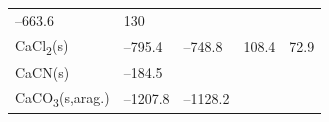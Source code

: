 \documentclass[
  9pt,
]{extbook}
\theoremstyle{definition}
\theoremstyle{definition}
\theoremstyle{definition}
\theoremstyle{remark}
\begin{document}
\begin{longtable}[]{@{}lllll@{}}
\begin{minipage}[t]{0.20\columnwidth}
--663.6\strut
\end{minipage} & \begin{minipage}[t]{0.18\columnwidth}\raggedright
130\strut
\end{minipage} & \begin{minipage}[t]{0.18\columnwidth}\raggedright
\strut
\end{minipage}\tabularnewline
\begin{minipage}[t]{0.10\columnwidth}\raggedright
CaCl\textsubscript{2}(s)\strut
\end{minipage} & \begin{minipage}[t]{0.19\columnwidth}\raggedright
--795.4\strut
\end{minipage} & \begin{minipage}[t]{0.20\columnwidth}\raggedright
--748.8\strut
\end{minipage} & \begin{minipage}[t]{0.18\columnwidth}\raggedright
108.4\strut
\end{minipage} & \begin{minipage}[t]{0.18\columnwidth}\raggedright
72.9\strut
\end{minipage}\tabularnewline
\begin{minipage}[t]{0.10\columnwidth}\raggedright
CaCN(s)\strut
\end{minipage} & \begin{minipage}[t]{0.19\columnwidth}\raggedright
--184.5\strut
\end{minipage} & \begin{minipage}[t]{0.20\columnwidth}\raggedright
\strut
\end{minipage} & \begin{minipage}[t]{0.18\columnwidth}\raggedright
\strut
\end{minipage} & \begin{minipage}[t]{0.18\columnwidth}\raggedright
\strut
\end{minipage}\tabularnewline
\begin{minipage}[t]{0.10\columnwidth}\raggedright
CaCO\textsubscript{3}(s,arag.)\strut
\end{minipage} & \begin{minipage}[t]{0.19\columnwidth}\raggedright
--1207.8\strut
\end{minipage} & \begin{minipage}[t]{0.20\columnwidth}\raggedright
--1128.2\strut
\end{minipage} & \begin{minipage}[t]{0.18\columnwidth}\raggedright

\end{minipage}
\end{longtable}
\end{document}
